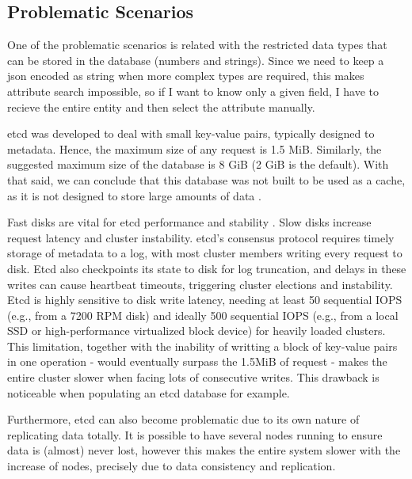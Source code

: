 \documentclass[screen,review]{acmart}
\begin{document}
\subsection{Problematic Scenarios}

One of the problematic scenarios is related with the restricted data types that can be stored in the database (numbers and strings). Since we need to keep a json encoded as string when more complex types are required, this makes attribute search impossible, so if I want to know only a given field, I have to recieve the entire entity and then select the attribute manually.

etcd was developed to deal with small key-value pairs, typically designed to metadata. Hence, the maximum size of any request is 1.5 MiB. Similarly, the suggested maximum size of the database is 8 GiB (2 GiB is the default). With that said, we can conclude that this database was not built to be used as a cache, as it is not designed to store large amounts of data \cite{etcd_sys_limits}.

Fast disks are vital for etcd performance and stability \cite{etcd_hw}. Slow disks increase request latency and cluster instability. etcd's consensus protocol requires timely storage of metadata to a log, with most cluster members writing every request to disk. Etcd also checkpoints its state to disk for log truncation, and delays in these writes can cause heartbeat timeouts, triggering cluster elections and instability. Etcd is highly sensitive to disk write latency, needing at least 50 sequential IOPS (e.g., from a 7200 RPM disk) and ideally 500 sequential IOPS (e.g., from a local SSD or high-performance virtualized block device) for heavily loaded clusters. This limitation, together with the inability of writting a block of key-value pairs in one operation - would eventually surpass the 1.5MiB of request - makes the entire cluster slower when facing lots of consecutive writes. This drawback is noticeable when populating an etcd database for example.

Furthermore, etcd can also become problematic due to its own nature of replicating data totally. It is possible to have several nodes running to ensure data is (almost) never lost, however this makes the entire system slower with the increase of nodes, precisely due to data consistency and replication.
\end{document}
